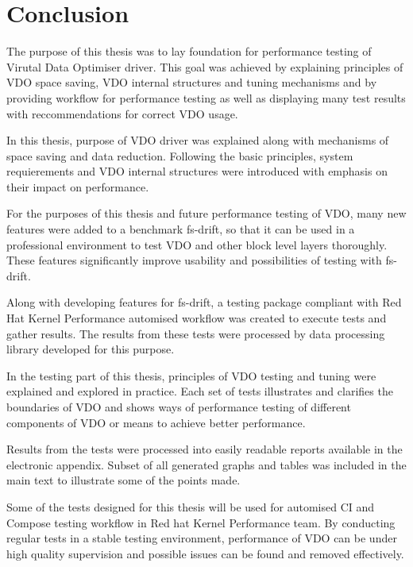 \documentclass[
  color, %
  table, %
  lof,   %
  lot,   %
]{fithesis3}
\begin{document}



\chapter{Conclusion}
\label{conclusion}
The purpose of this thesis was to lay foundation for performance testing of Virutal Data Optimiser driver. This goal was achieved by explaining principles of VDO space saving, VDO internal structures and tuning mechanisms and by providing workflow for performance testing as well as displaying many test results with reccommendations for correct VDO usage.

In this thesis, purpose of VDO driver was explained along with mechanisms of space saving and data reduction. Following the basic principles, system requierements and VDO internal structures were introduced with emphasis on their impact on performance.

For the purposes of this thesis and future performance testing of VDO, many new features were added to a benchmark fs-drift, so that it can be used in a professional environment to test VDO and other block level layers thoroughly. These features significantly improve usability and possibilities of testing with fs-drift.

Along with developing features for fs-drift, a testing package compliant with Red Hat Kernel Performance automised workflow was created to execute tests and gather results. The results from these tests were processed by data processing library developed for this purpose.

In the testing part of this thesis, principles of VDO testing and tuning were explained and explored in practice. Each set of tests illustrates and clarifies the boundaries of VDO and shows ways of performance testing of different components of VDO or means to achieve better performance. 

Results from the tests were processed into easily readable reports available in the electronic appendix. Subset of all generated graphs and tables was included in the main text to illustrate some of the points made.

Some of the tests designed for this thesis will be used for automised CI and Compose testing workflow in Red hat Kernel Performance team. By conducting regular tests in a stable testing environment, performance of VDO can be under high quality supervision and possible issues can be found and removed effectively.
\end{document}
